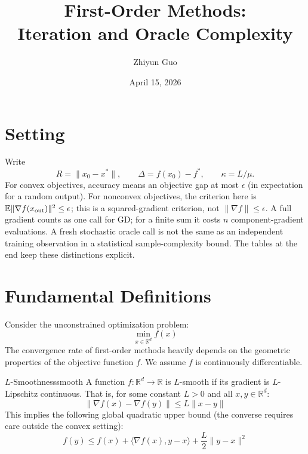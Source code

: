 \documentclass[11pt]{article}
\title{\sffamily \bfseries \color{thmcolor} First-Order Methods: \\ Iteration and Oracle Complexity}
\author{Zhiyun Guo}
\date{April 15, 2026}\fancyhead[R]{\sffamily\footnotesize First-Order Methods}
\begin{document}
\maketitle

\section{Setting}
Write
\[
R=\|x_0-x^*\|,\qquad \Delta=f(x_0)-f^*,\qquad \kappa=L/\mu.
\]
For convex objectives, accuracy means an objective gap at most $\epsilon$ (in expectation for a random output). For nonconvex objectives, the criterion here is $\mathbb E\|\nabla f(x_{\rm out})\|^2\le\epsilon$; this is a squared-gradient criterion, not $\|\nabla f\|\le\epsilon$.
A full gradient counts as one call for GD; for a finite sum it costs $n$ component-gradient evaluations. A fresh stochastic oracle call is not the same as an independent training observation in a statistical sample-complexity bound. The tables at the end keep these distinctions explicit.

\section{Fundamental Definitions}

Consider the unconstrained optimization problem:
\begin{equation}
    \min_{x \in \mathbb{R}^d} f(x)
\end{equation}
The convergence rate of first-order methods heavily depends on the geometric properties of the objective function $f$. We assume $f$ is continuously differentiable.

\begin{definition}{$L$-Smoothness}{smooth}
A function $f: \mathbb{R}^d \to \mathbb{R}$ is $L$-smooth if its gradient is $L$-Lipschitz continuous. That is, for some constant $L > 0$ and all $x, y \in \mathbb{R}^d$:
\begin{equation}
    \|\nabla f(x) - \nabla f(y)\| \le L\|x - y\|
\end{equation}
This implies the following global quadratic upper bound (the converse requires care outside the convex setting):
\begin{equation*}
    f(y) \le f(x) + \langle \nabla f(x), y - x \rangle + \frac{L}{2}\|y - x\|^2
\end{equation*}
\end{definition}
\end{document}
